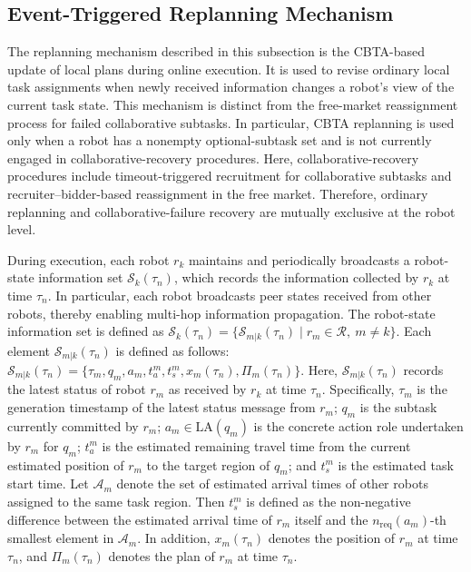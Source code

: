 \documentclass[lettersize,journal]{IEEEtran}
\begin{document}
\subsection{Event-Triggered Replanning Mechanism}

The replanning mechanism described in this subsection is the CBTA-based update of local plans during online execution. It is used to revise ordinary local task assignments when newly received information changes a robot's view of the current task state. This mechanism is distinct from the free-market reassignment process for failed collaborative subtasks. In particular, CBTA replanning is used only when a robot has a nonempty optional-subtask set and is not currently engaged in collaborative-recovery procedures. Here, collaborative-recovery procedures include timeout-triggered recruitment for collaborative subtasks and recruiter--bidder-based reassignment in the free market. Therefore, ordinary replanning and collaborative-failure recovery are mutually exclusive at the robot level.



During execution, each robot $r_k$ maintains and periodically broadcasts a robot-state information set $\mathcal{S}_k(\tau_n)$, which records the information collected by $r_k$ at time $\tau_n$. In particular, each robot broadcasts peer states received from other robots, thereby enabling multi-hop information propagation. The robot-state information set is defined as $\mathcal{S}_k(\tau_n)=\{\mathcal{S}_{m|k}(\tau_n)\mid r_m\in\mathcal{R},\ m\neq k\}$. Each element $\mathcal{S}_{m|k}(\tau_n)$ is defined as follows: $\mathcal{S}_{m|k}(\tau_n)=\{\tau_m,q_m,a_m,t_a^m,t_s^m,{x}_{m}(\tau_n),\Pi_m(\tau_n)\}$.
Here, $\mathcal{S}_{m|k}(\tau_n)$ records the latest status of robot $r_m$ as received by $r_k$ at time $\tau_n$. Specifically, $\tau_m$ is the generation timestamp of the latest status message from $r_m$; $q_m$ is the subtask currently committed by $r_m$; $a_m \in \mathrm{LA}(q_m)$ is the concrete action role undertaken by $r_m$ for $q_m$; $t_a^m$ is the estimated remaining travel time from the current estimated position of $r_m$ to the target region of $q_m$; and $t_s^m$ is the estimated task start time. Let $\mathcal{A}_m$ denote the set of estimated arrival times of other robots assigned to the same task region. Then $t_s^m$ is defined as the non-negative difference between the estimated arrival time of $r_m$ itself and the $n_{\mathrm{req}}(a_m)$-th smallest element in $\mathcal{A}_m$. In addition, ${x}_{m}(\tau_n)$ denotes the position of $r_m$ at time $\tau_n$, and $\Pi_m(\tau_n)$ denotes the plan of $r_m$ at time $\tau_n$.
\end{document}
